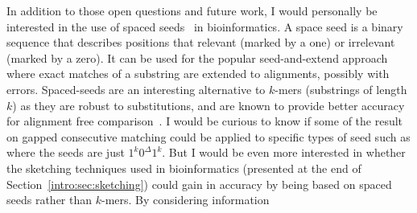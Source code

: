 %
In addition to those open questions and future work, I would personally be interested in the use of spaced seeds~\cite{li2004patternhunter} in bioinformatics. A space seed is a binary sequence that describes positions that relevant (marked by a one) or irrelevant (marked by a zero). It can be used for the popular seed-and-extend approach where exact matches of a substring are extended to alignments, possibly with errors.
Spaced-seeds are an interesting alternative to $k$-mers (substrings of length $k$) as they are robust to substitutions, and are known to provide better accuracy for alignment free comparison~\cite{}.
I would be curious to know if some of the result on gapped consecutive matching could be applied to specific types of seed such as \cite{} where the seeds are just $1^k 0^\Delta 1^k$.
But I would be even more interested in whether the sketching techniques used in bioinformatics (presented at the end of Section~\ref{intro:sec:sketching}) could gain in accuracy by being based on spaced seeds rather than $k$-mers. By considering information
\backmatter